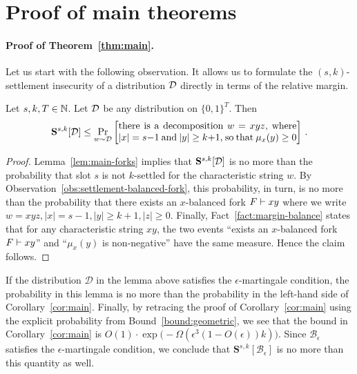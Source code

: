 \section{Proof of main theorems}\label{sec:thm-proofs}

\paragraph{Proof of Theorem~\ref{thm:main}.}

Let us start with the following observation.
It allows us to formulate the
$(s, k)$-settlement insecurity of a distribution $\mathcal{D}$
directly in terms of the relative margin.

\begin{lemma}\label{lemma:settlement-margin}
  Let $s, k, T \in \mathbb{N}$. 
  Let $\mathcal{D}$ be any distribution on $\{0,1\}^T$. 
  Then
  \[
    \mathbf{S}^{s,k}[\Distribution] \leq
      \Pr_{w \sim \Distribution} \left[\parbox{65mm}{
          there is a decomposition $w = x y z$, 
          where $|x| = s - 1$ and $|y| \geq k + 1$, 
          so that $\mu_x(y) \geq 0$
      }\right]
    \,.
  \]
\end{lemma}
\begin{proof}
  Lemma~\ref{lem:main-forks} implies that 
  $\mathbf{S}^{s,k}[\mathcal{D}]$ is no more than 
  the probability that slot $s$ is not $k$-settled 
  for the characteristic string $w$. 
  By Observation~\ref{obs:settlement-balanced-fork}, 
  this probability, in turn, is no more than 
  the probability that there exists an $x$-balanced fork 
  $F \vdash xy$
  where we write $w = xyz, |x| = s - 1, |y| \geq k + 1, |z| \geq 0$. 
  Finally, Fact~\ref{fact:margin-balance} states that 
  for any characteristic string $xy$, 
  the two events ``exists an $x$-balanced fork $F \vdash xy$'' 
  and ``$\mu_x(y)$ is non-negative'' have the same measure. 
  Hence the claim follows. 
\end{proof}

If the distribution $\mathcal{D}$ in the lemma above 
satisfies the $\epsilon$-martingale condition, 
the probability in this lemma is no more than the probability 
in the left-hand side of Corollary~\ref{cor:main}. 
Finally, by retracing the proof of Corollary~\ref{cor:main} 
using the explicit probability from Bound~\ref{bound:geometric}, 
we see that the bound in Corollary~\ref{cor:main} is 
$O(1) \cdot \exp\bigl(-\Omega(\epsilon^3 (1 - O(\epsilon))k)\bigr)$. 
Since $\mathcal{B}_\epsilon$ satisfies the $\epsilon$-martingale condition, 
we conclude that $\mathbf{S}^{s,k}[\mathcal{B}_\epsilon]$ is no more than 
this quantity as well.


